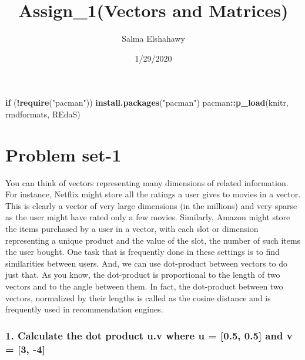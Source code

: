 \documentclass[]{article}
\title{Assign\_1(Vectors and Matrices)}
\author{Salma Elshahawy}
\date{1/29/2020}
\newenvironment{Shaded}{\begin{snugshade}}{\end{snugshade}}
\newcommand{\ControlFlowTok}[1]{\textcolor[rgb]{0.13,0.29,0.53}{\textbf{#1}}}
\newcommand{\DecValTok}[1]{\textcolor[rgb]{0.00,0.00,0.81}{#1}}
\newcommand{\FloatTok}[1]{\textcolor[rgb]{0.00,0.00,0.81}{#1}}
\newcommand{\KeywordTok}[1]{\textcolor[rgb]{0.13,0.29,0.53}{\textbf{#1}}}
\newcommand{\NormalTok}[1]{#1}
\newcommand{\OperatorTok}[1]{\textcolor[rgb]{0.81,0.36,0.00}{\textbf{#1}}}
\newcommand{\StringTok}[1]{\textcolor[rgb]{0.31,0.60,0.02}{#1}}
\begin{document}
\maketitle

\begin{Shaded}
\begin{Highlighting}[]
\ControlFlowTok{if}\NormalTok{ (}\OperatorTok{!}\KeywordTok{require}\NormalTok{(}\StringTok{"pacman"}\NormalTok{)) }\KeywordTok{install.packages}\NormalTok{(}\StringTok{"pacman"}\NormalTok{)}
\NormalTok{pacman}\OperatorTok{::}\KeywordTok{p_load}\NormalTok{(knitr, rmdformats, REdaS)}
\end{Highlighting}
\end{Shaded}

\hypertarget{problem-set-1}{%
\section{Problem set-1}\label{problem-set-1}}

You can think of vectors representing many dimensions of related
information. For instance, Netflix might store all the ratings a user
gives to movies in a vector. This is clearly a vector of very large
dimensions (in the millions) and very sparse as the user might have
rated only a few movies. Similarly, Amazon might store the items
purchased by a user in a vector, with each slot or dimension
representing a unique product and the value of the slot, the number of
such items the user bought. One task that is frequently done in these
settings is to find similarities between users. And, we can use
dot-product between vectors to do just that. As you know, the
dot-product is proportional to the length of two vectors and to the
angle between them. In fact, the dot-product between two vectors,
normalized by their lengths is called as the cosine distance and is
frequently used in recommendation engines.

\hypertarget{calculate-the-dot-product-u.v-where-u-0.5-0.5-and-v-3--4}{%
\subsubsection{1. Calculate the dot product u.v where u = {[}0.5, 0.5{]}
and v = {[}3,
-4{]}}\label{calculate-the-dot-product-u.v-where-u-0.5-0.5-and-v-3--4}}

\begin{Shaded}
\end{Shaded}
\end{document}
